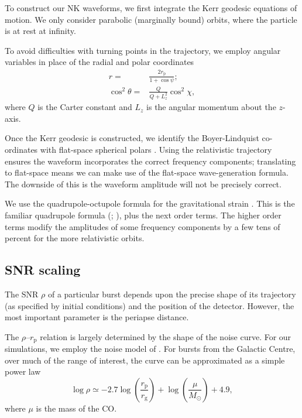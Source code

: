 \documentclass[useAMS,usedcolumn,usegraphicx,usenatbib]{mn2e}
\newcommand{\sub}[1]{\ensuremath{_\mathrm{#1}}}
\begin{document}
To construct our NK waveforms, we first integrate the Kerr geodesic equations of motion. We only consider parabolic (marginally bound) orbits, where the particle is at rest at infinity.

To avoid difficulties with turning points in the trajectory, we employ angular variables in place of the radial and polar coordinates \citep{Drasco2004}
\begin{align}
r = {} & \frac{2 r\sub{p}}{1 + \cos\psi};\\
\cos^2\theta = {} & \frac{Q}{Q+L_z^2}\cos^2\chi,
\end{align}
where $Q$ is the Carter constant and $L_z$ is the angular momentum about the $z$-axis.

Once the Kerr geodesic is constructed, we identify the Boyer-Lindquist co-ordinates with flat-space spherical polars \citep{Gair2005, Babak2007}. Using the relativistic trajectory ensures the waveform incorporates the correct frequency components; translating to flat-space means we can make use of the flat-space wave-generation formula. The downside of this is the waveform amplitude will not be precisely correct.

We use the quadrupole-octupole formula for the gravitational strain \citep{Bekenstein1973, Press1977, Yunes2008}. This is the familiar quadrupole formula (\citealt*[section 36.10]{Misner1973}; \citealt[section 17.9]{Hobson2006}), plus the next order terms. The higher order terms modify the amplitudes of some frequency components by a few tens of percent for the more relativistic orbits.

\subsection{SNR scaling\label{sec:SNR}}

The SNR $\rho$ of a particular burst depends upon the precise shape of its trajectory (as specified by initial conditions) and the position of the detector. However, the most important parameter is the periapse distance.

The $\rho$--$r\sub{p}$ relation is largely determined by the shape of the noise curve. For our simulations, we employ the noise model of \citet{Barack2004}. For bursts from the Galactic Centre, over much of the range of interest, the curve can be approximated as a simple power law \citep{Berry2012}
\begin{equation}
\log\rho \simeq -2.7\log\left(\frac{r\sub{p}}{r\sub{g}}\right) + \log\left(\frac{\mu}{M_\odot}\right) + 4.9,
\label{eq:SNR-scaling}
\end{equation}
where $\mu$ is the mass of the CO.
\end{document}
